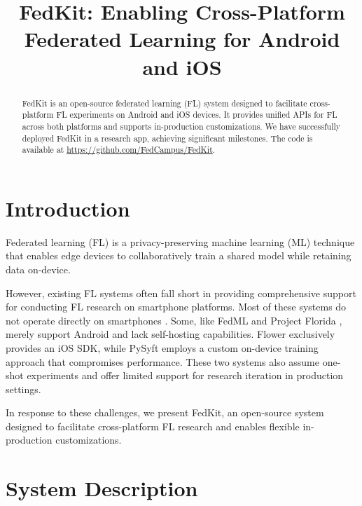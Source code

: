 \documentclass[letterpaper]{article} %
\title{FedKit: Enabling Cross-Platform Federated Learning for Android and iOS}
\author{}
\begin{document}
\maketitle

\begin{abstract}
    FedKit is an open-source federated learning (FL) system designed to
    facilitate cross-platform FL experiments on Android and iOS devices.
    It provides unified APIs for FL across both platforms and supports
    in-production customizations.
    We have successfully deployed FedKit in a research app,
    achieving significant milestones.
    The code is available at \url{https://github.com/FedCampus/FedKit}.
\end{abstract}

\section{Introduction}

Federated learning (FL) is a privacy-preserving machine learning (ML) technique
that enables edge devices to collaboratively train a shared model while
retaining data on-device.

However, existing FL systems often fall short in
providing comprehensive support for conducting FL research on
smartphone platforms.
Most of these systems do not operate directly on smartphones
\cite[e.g.,][]{bonawitz2019towards,liu2021fate,ma2019paddlepaddle,openfl_citation}.
Some, like FedML \cite{he2020fedml} and
Project Florida \cite{madrigal2023project},
merely support Android and lack self-hosting capabilities.
Flower \cite{beutel2020flower,mathur2021ondevice} exclusively provides
an iOS SDK,
while PySyft \cite{ryffel2018generic,Ziller2021,hall2021syft} employs
a custom on-device training approach that compromises performance.
These two systems also assume one-shot experiments and
offer limited support for research iteration in production settings.

In response to these challenges, we present FedKit,
an open-source system designed to facilitate cross-platform FL research and
enables flexible in-production customizations.

\section{System Description}
\end{document}
